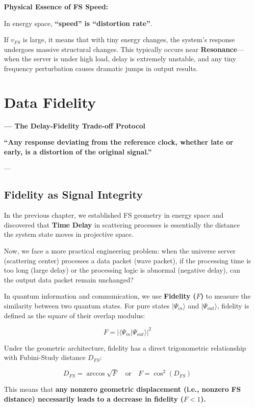 \documentclass[11pt,a4paper,twoside]{book}
\begin{document}
\textbf{Physical Essence of FS Speed:}

In energy space, \textbf{``speed'' is ``distortion rate''}.

If $v_{FS}$ is large, it means that with tiny energy changes, the system's response undergoes massive structural changes. This typically occurs near \textbf{Resonance}---when the server is under high load, delay is extremely unstable, and any tiny frequency perturbation causes dramatic jumps in output results.

 \section{Data Fidelity}

\textbf{--- The Delay-Fidelity Trade-off Protocol}

\textbf{``Any response deviating from the reference clock, whether late or early, is a distortion of the original signal.''}

---

\subsection{Fidelity as Signal Integrity}

In the previous chapter, we established FS geometry in energy space and discovered that \textbf{Time Delay} in scattering processes is essentially the distance the system state moves in projective space.

Now, we face a more practical engineering problem: when the universe server (scattering center) processes a data packet (wave packet), if the processing time is too long (large delay) or the processing logic is abnormal (negative delay), can the output data packet remain unchanged?

In quantum information and communication, we use \textbf{Fidelity ($F$)} to measure the similarity between two quantum states. For pure states $|\Psi_{in}\rangle$ and $|\Psi_{out}\rangle$, fidelity is defined as the square of their overlap modulus:

$$F = |\langle \Psi_{in} | \Psi_{out} \rangle|^2$$

Under the geometric architecture, fidelity has a direct trigonometric relationship with Fubini-Study distance $D_{FS}$:

$$D_{FS} = \arccos \sqrt{F} \quad \text{or} \quad F = \cos^2(D_{FS})$$

This means that \textbf{any nonzero geometric displacement (i.e., nonzero FS distance) necessarily leads to a decrease in fidelity ($F < 1$).}
\end{document}
